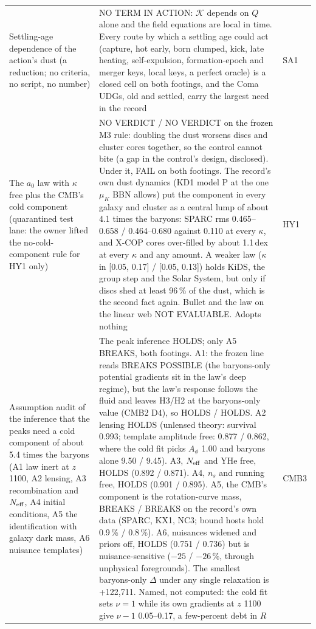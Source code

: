 \documentclass[10pt]{article}
\begin{document}
\begin{longtable}{@{}p{4.4cm}p{8.6cm}p{2.8cm}@{}}
Settling-age dependence of the action's dust (a reduction; no criteria, no script, no number) & NO TERM IN ACTION: $\mathcal K$ depends on $Q$ alone and the field equations are local in time. Every route by which a settling age could act (capture, hot early, born clumped, kick, late heating, self-expulsion, formation-epoch and merger keys, local keys, a perfect oracle) is a closed cell on both footings, and the Coma UDGs, old and settled, carry the largest need in the record & SA1\\
The $a_0$ law with $\kappa$ free plus the CMB's cold component (quarantined test lane: the owner lifted the no-cold-component rule for HY1 only) & NO VERDICT / NO VERDICT on the frozen M3 rule: doubling the dust worsens discs and cluster cores together, so the control cannot bite (a gap in the control's design, disclosed). Under it, FAIL on both footings. The record's own dust dynamics (KD1 model P at the one $\mu_K$ BBN allows) put the component in every galaxy and cluster as a central lump of about 4.1 times the baryons: SPARC rms 0.465--0.658 / 0.464--0.680 against 0.110 at every $\kappa$, and X-COP cores over-filled by about 1.1\,dex at every $\kappa$ and any amount. A weaker law ($\kappa$ in [0.05, 0.17] / [0.05, 0.13]) holds KiDS, the group step and the Solar System, but only if discs shed at least 96\,\% of the dust, which is the second fact again. Bullet and the law on the linear web NOT EVALUABLE. Adopts nothing & HY1\\
Assumption audit of the inference that the peaks need a cold component of about 5.4 times the baryons (A1 law inert at $z$ 1100, A2 lensing, A3 recombination and $N_{\rm eff}$, A4 initial conditions, A5 the identification with galaxy dark mass, A6 nuisance templates) & The peak inference HOLDS; only A5 BREAKS, both footings. A1: the frozen line reads BREAKS POSSIBLE (the baryons-only potential gradients sit in the law's deep regime), but the law's response follows the fluid and leaves H3/H2 at the baryons-only value (CMB2 D4), so HOLDS / HOLDS. A2 lensing HOLDS (unlensed theory: survival 0.993; template amplitude free: 0.877 / 0.862, where the cold fit picks $A_\phi$ 1.00 and baryons alone 9.50 / 9.45). A3, $N_{\rm eff}$ and YHe free, HOLDS (0.892 / 0.871). A4, $n_s$ and running free, HOLDS (0.901 / 0.895). A5, the CMB's component is the rotation-curve mass, BREAKS / BREAKS on the record's own data (SPARC, KX1, NC3; bound hosts hold 0.9\,\% / 0.8\,\%). A6, nuisances widened and priors off, HOLDS (0.751 / 0.736) but is nuisance-sensitive ($-25$ / $-26$\,\%, through unphysical foregrounds). The smallest baryons-only $\Delta$ under any single relaxation is +122,711. Named, not computed: the cold fit sets $\nu=1$ while its own gradients at $z$ 1100 give $\nu-1$ 0.05--0.17, a few-percent debt in $R$ & CMB3\\

\end{longtable}
\end{document}
